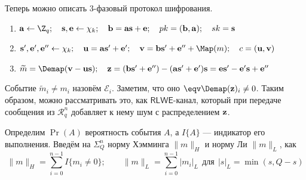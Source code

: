 Теперь можно описать $3$-фазовый протокол шифрования.
\begin{enumerate}
	\item $\bold a \leftarrow \Z_q; \quad \bold s, \bold e \leftarrow \chi_k; \quad \bold b = \bold a\bold s+\bold e; \quad pk = (\bold b, \bold a); \quad sk = \bold s$
	\item $\bold{s'}, \bold{e'}, \bold{e''} \leftarrow \chi_k; \quad \bold u = \bold a\bold{s'}+\bold{e'}; \quad \bold v = \bold b\bold{s'}+\bold{e''}+\Map(m); \quad c = (\bold u, \bold v)$
	\item $\widetilde m = \Demap(\bold v-\bold u\bold s); \quad \bold z = (\bold b\bold{s'}+\bold{e''})-(\bold a\bold{s'}+\bold{e'})\bold s = \bold e\bold{s'}-\bold{e'}\bold s+\bold{e''}$
\end{enumerate}

Событие $\widetilde m_i \neq m_i$ назовём $\mathcal{E}_i$. Заметим, что оно $\eqv \Demap(\bold z)_i \neq 0$. Таким образом, можно рассматривать это, как $\mathsf{RLWE}$-канал, который при передаче сообщения из $\mathcal{R}_q^n$ добавляет к нему шум с распределением $\bold z$.

Определим $\Pr(A)$ вероятность события $A$, а $I\{A\}$ --- индикатор его выполнения. Введём на $\Sigma_Q^n$ норму Хэмминга $\|m\|_H$ и норму Ли $\|m\|_L$, как
\begin{equation*}
	\|m\|_H = \sum_{i=0}^{n-1}{I\{m_i \neq 0\}}; \qquad \|m\|_L = \sum_{i=0}^{n-1}{|m_i|_L} \,\;\text{для}\;\, |s|_L = \min(s, Q-s)
\end{equation*}

